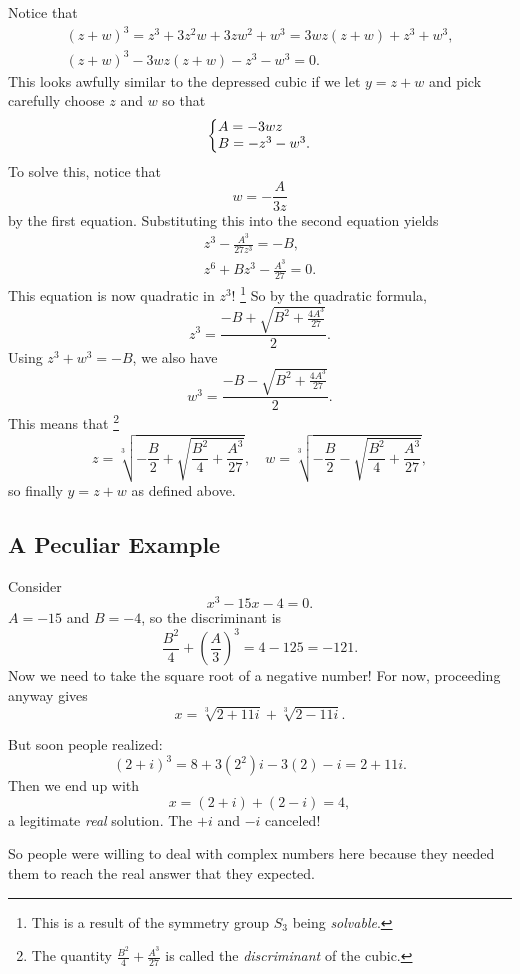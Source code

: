 Notice that
\begin{gather*}
  (z + w)^3 = z^3 + 3z^2w + 3zw^2 + w^3 = 3wz(z + w) + z^3 + w^3, \\
  (z + w)^3 - 3wz(z + w) - z^3 - w^3 = 0.
\end{gather*}
This looks awfully similar to the depressed cubic if
we let $y = z + w$ and pick carefully choose $z$ and $w$
so that
\[
\left\{\begin{array}{@{}l@{}}
  A = -3wz \\
  B = -z^3 - w^3.
\end{array}\right.
\] 
To solve this, notice that
\[w = -\frac{A}{3z}\]
by the first equation. Substituting this into the second
equation yields
\begin{gather*}
  z^3 - \frac{A^3}{27z^3} = -B, \\
  z^6 + Bz^3 - \frac{A^3}{27} = 0.
\end{gather*}
This equation is now quadratic in $z^3$!
\footnote{This is a result of the symmetry group $S_3$ being \textit{solvable}.}
So by the quadratic formula,
\[
  z^3 = \frac{-B + \sqrt{B^2 + \frac{4A^3}{27}}}{2}
.\] 
Using $z^3 + w^3 = -B$, we also have
\[
  w^3 = \frac{-B - \sqrt{B^2 + \frac{4A^3}{27}}}{2}
.\] 
This means that
\footnote{The quantity $\frac{B^2}{4} + \frac{A^3}{27}$ is called the \textit{discriminant} of the cubic.}
\[
  z = \sqrt[3]{-\frac{B}{2} + \sqrt{\frac{B^2}{4} + \frac{A^3}{27}}}, \quad
  w = \sqrt[3]{-\frac{B}{2} - \sqrt{\frac{B^2}{4} + \frac{A^3}{27}}},
\]
so finally $y = z + w$ as defined above.

\subsection{A Peculiar Example}
Consider
\[x^3 - 15x - 4 = 0.\]
$A = -15$ and $B = -4$, so the discriminant is
 \[
\frac{B^2}{4} + \left(\frac{A}{3}\right)^3 = 4 - 125 = -121
.\]
Now we need to take the square root of a negative
number! For now, proceeding anyway gives
\[
x = \sqrt[3]{2 + 11i} + \sqrt[3]{2 - 11i}
.\] 

But soon people realized:
\[
  (2 + i)^3 = 8 + 3(2^2)i - 3(2) - i = 2 + 11i
.\] 
Then we end up with
\[x = (2 + i) + (2 - i) = 4,\]
a legitimate \textit{real} solution. The $+i$ and $-i$
canceled!

So people were willing to deal with complex
numbers here because they needed them to reach the real
answer that they expected.
